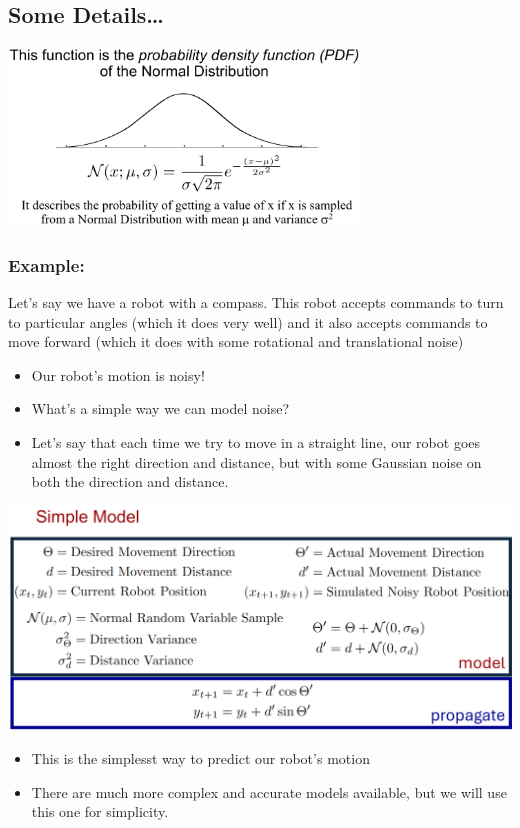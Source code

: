 \documentclass[10pt]{article}
\begin{document}
\subsection*{Some Details\dots}
\begin{center} 
	\includegraphics*[width=0.7\textwidth]{L1_7.png} 
\end{center}

\subsubsection*{Example:}
Let's say we have a robot with a compass.  This robot accepts commands to turn to particular angles (which it does very well) and it also accepts commands to move forward (which it does with some rotational and translational noise)
\begin{itemize}
	\item Our robot's motion is noisy!
	\item What's a simple way we can model noise?
	\item Let's say that each time we try to move in a straight line, our robot goes almost the right direction and distance, but with some Gaussian noise on both the direction and distance.
\end{itemize}

\begin{center} 
	\includegraphics*[width=\textwidth]{L1_8.png} 
\end{center}
\begin{itemize}
	\item This is the simplesst way to predict our robot's motion
	\item There are much more complex and accurate models available, but we will use this one for simplicity.
\end{itemize}
\end{document}
